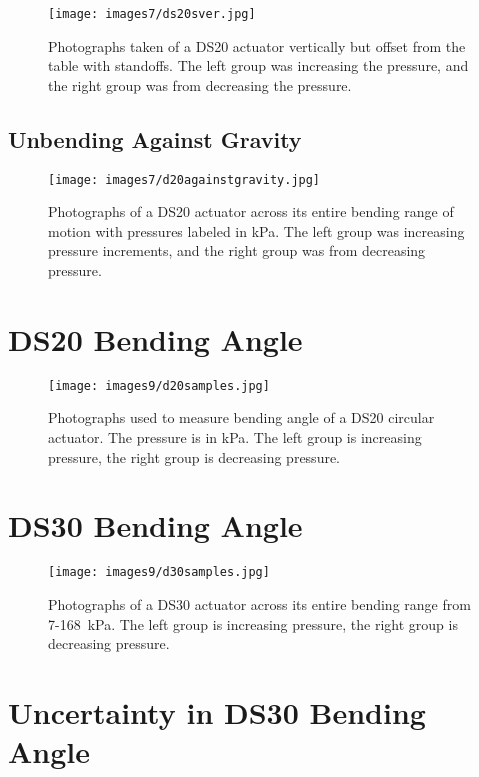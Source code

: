 \begin{figure}[!ht]
    \centering
     \texttt{[image: images7/ds20sver.jpg]}
    \caption{Photographs taken of a DS20 actuator vertically but offset from the table with standoffs. The left group was increasing the pressure, and the right group was from decreasing the pressure.}
    \label{fig:ds20sver}
\end{figure}

\clearpage
\section{Unbending Against Gravity}

\begin{figure}[!ht]
    \centering
     \texttt{[image: images7/d20againstgravity.jpg]}
    \caption{Photographs of a DS20 actuator across its entire bending range of motion with pressures labeled in kPa. The left group was increasing pressure increments, and the right group was from decreasing pressure.}
    \label{fig:d20againstgravity}
\end{figure}

\clearpage
\chapter{DS20 Bending Angle}
\label{appendix:d20all}

\begin{figure}[ht]
    \centering
     \texttt{[image: images9/d20samples.jpg]}
    \caption{Photographs used to measure bending angle of a DS20 circular actuator. The pressure is in kPa. The left group is increasing pressure, the right group is decreasing pressure.}
    \label{fig:d20samples}
\end{figure}

\chapter{DS30 Bending Angle}
\label{appendix:d30all}

\begin{figure}[ht]
    \centering
     \texttt{[image: images9/d30samples.jpg]}
    \caption{Photographs of a DS30 actuator across its entire bending range from 7-168~kPa. The left group is increasing pressure, the right group is decreasing pressure.}
    \label{fig:d30samples}
\end{figure}

\chapter{Uncertainty in DS30 Bending Angle}
\label{appendix:d30seahorse}

